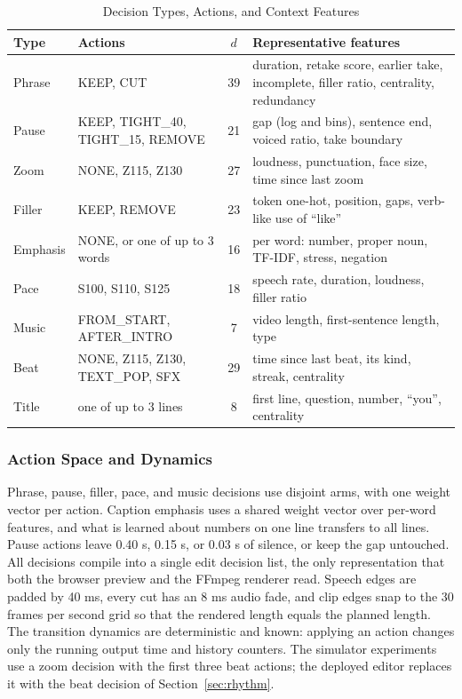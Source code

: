\documentclass{ieeeaccess}
\begin{document}
\begin{table}[t]
\caption{Decision Types, Actions, and Context Features}
\label{tab:decisions}
\setlength{\tabcolsep}{2.5pt}
\centering
\begin{tabular}{|p{11mm}|p{25mm}|c|p{32mm}|}
\hline
Type & Actions & $d$ & Representative features \\
\hline
Phrase & KEEP, CUT & 39 & duration, retake score, earlier take, incomplete, filler ratio, centrality, redundancy \\
Pause & KEEP, TIGHT\_40, TIGHT\_15, REMOVE & 21 & gap (log and bins), sentence end, voiced ratio, take boundary \\
Zoom & NONE, Z115, Z130 & 27 & loudness, punctuation, face size, time since last zoom \\
Filler & KEEP, REMOVE & 23 & token one-hot, position, gaps, verb-like use of ``like'' \\
Emphasis & NONE, or one of up to 3 words & 16 & per word: number, proper noun, TF-IDF, stress, negation \\
Pace & S100, S110, S125 & 18 & speech rate, duration, loudness, filler ratio \\
Music & FROM\_START, AFTER\_INTRO & 7 & video length, first-sentence length, type \\
Beat & NONE, Z115, Z130, TEXT\_POP, SFX & 29 & time since last beat, its kind, streak, centrality \\
Title & one of up to 3 lines & 8 & first line, question, number, ``you'', centrality \\
\hline
\end{tabular}
\end{table}

\subsubsection{Action Space and Dynamics}
Phrase, pause, filler, pace, and music decisions use disjoint arms, with one weight vector per action. Caption emphasis uses a shared weight vector over per-word features, and what is learned about numbers on one line transfers to all lines. Pause actions leave 0.40 s, 0.15 s, or 0.03 s of silence, or keep the gap untouched. All decisions compile into a single edit decision list, the only representation that both the browser preview and the FFmpeg renderer read. Speech edges are padded by 40 ms, every cut has an 8 ms audio fade, and clip edges snap to the 30 frames per second grid so that the rendered length equals the planned length. The transition dynamics are deterministic and known: applying an action changes only the running output time and history counters. The simulator experiments use a zoom decision with the first three beat actions; the deployed editor replaces it with the beat decision of Section~\ref{sec:rhythm}.
\end{document}
